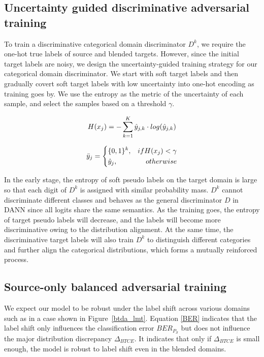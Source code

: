 \documentclass[letterpaper]{article} \usepackage{aaai23}  \usepackage{times}  \usepackage{helvet}  \usepackage{courier}  \usepackage[hyphens]{url}  \usepackage{graphicx} \urlstyle{rm} \def\UrlFont{\rm}  \usepackage{natbib}  \usepackage{caption} \frenchspacing  \setlength{\pdfpagewidth}{8.5in}  \setlength{\pdfpageheight}{11in}
\begin{document}
\subsection{Uncertainty guided discriminative adversarial training}
To train a discriminative categorical domain discriminator $D^k$, we require the one-hot true labels of source and blended targets. However, since the initial target labels are noisy, we design the uncertainty-guided training strategy for our categorical domain discriminator. We start with soft target labels and then gradually covert soft target labels with low uncertainty into one-hot encoding as training goes by. We use the entropy as the metric of the uncertainty of each sample, and select the samples based on a threshold $\gamma$. 
\begin{small}
\begin{equation}
\setlength{\abovedisplayskip}{2pt}
\setlength{\belowdisplayskip}{2pt}
\begin{split}
H(x_j) = - \sum_{k=1}^K \hat{y}_{j,k} \cdot log(\hat{y}_{j,k})
\end{split}
\end{equation}
\end{small}
\begin{small}
\begin{equation}
\setlength{\abovedisplayskip}{2pt}
\setlength{\belowdisplayskip}{2pt}
\bar{y}_j=\left\{
\begin{aligned}
& \{0,1\}^k,     & if H(x_j) < \gamma \\
&  \hat{y}_j,  & otherwise \\
\end{aligned}
\right.
\end{equation}
\end{small}
In the early stage, the entropy of soft pseudo labels on the target domain is large so that each digit of $D^k$ is assigned with similar probability mass. $D^k$ cannot discriminate different classes and behaves as the general discriminator $D$ in DANN since all logits share the same semantics. As the training goes, the entropy of target pseudo labels will decrease, and the labels will become more discriminative owing to the distribution alignment. At the same time, the discriminative target labels will also train $D^k$ to distinguish different categories and further align the categorical distributions, which forms a mutually reinforced process.



\subsection{Source-only balanced adversarial training}
We expect our model to be robust under the label shift across various domains such as in a case shown in Figure~\ref{btda_lmt}. Equation \ref{BER} indicates that the label shift only influences the classification error $BER_{P_{\mathcal{S}}}$ but does not influence the major distribution discrepancy $\Delta_{BTCE}$. It indicates that only if $\Delta_{BTCE}$ is small enough, the model is robust to label shift even in the blended domains. 
\end{document}

